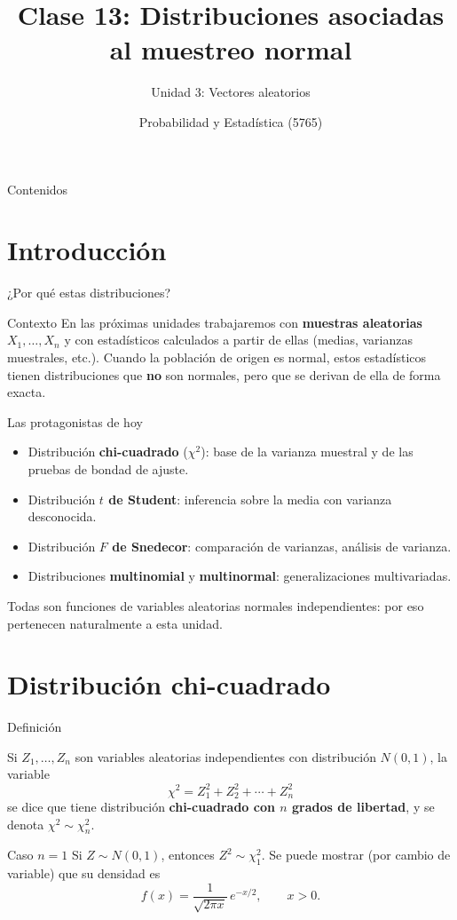 \documentclass[aspectratio=169,11pt]{beamer}
\title[Prob. y Estadística]{Clase 13: Distribuciones asociadas al muestreo normal}
\subtitle{Unidad 3: Vectores aleatorios}
\institute[UNS]{Universidad Nacional del Sur \\ Departamento de Matemática}
\author{Probabilidad y Estadística (5765)}
\date{}
\begin{document}
\begin{frame}
\titlepage
\end{frame}

\begin{frame}{Contenidos}
\tableofcontents
\end{frame}

\section{Introducción}

\begin{frame}{¿Por qué estas distribuciones?}
\begin{block}{Contexto}
En las próximas unidades trabajaremos con \textbf{muestras aleatorias} $X_1,\ldots,X_n$ y con estadísticos calculados a partir de ellas (medias, varianzas muestrales, etc.). Cuando la población de origen es normal, estos estadísticos tienen distribuciones que \textbf{no} son normales, pero que se derivan de ella de forma exacta.
\end{block}
\pause
\begin{block}{Las protagonistas de hoy}
\begin{itemize}
\item Distribución \textbf{chi-cuadrado} ($\chi^2$): base de la varianza muestral y de las pruebas de bondad de ajuste.
\item Distribución \textbf{$t$ de Student}: inferencia sobre la media con varianza desconocida.
\item Distribución \textbf{$F$ de Snedecor}: comparación de varianzas, análisis de varianza.
\item Distribuciones \textbf{multinomial} y \textbf{multinormal}: generalizaciones multivariadas.
\end{itemize}
Todas son funciones de variables aleatorias normales independientes: por eso pertenecen naturalmente a esta unidad.
\end{block}
\end{frame}

\section{Distribución chi-cuadrado}

\begin{frame}{Definición}
\begin{definition}
Si $Z_1,\ldots,Z_n$ son variables aleatorias independientes con distribución $N(0,1)$, la variable
\[
\chi^2 = Z_1^2+Z_2^2+\cdots+Z_n^2
\]
se dice que tiene distribución \textbf{chi-cuadrado con $n$ grados de libertad}, y se denota $\chi^2 \sim \chi^2_n$.
\end{definition}
\pause
\begin{block}{Caso $n=1$}
Si $Z\sim N(0,1)$, entonces $Z^2 \sim \chi_1^2$. Se puede mostrar (por cambio de variable) que su densidad es
\[
f(x) = \frac{1}{\sqrt{2\pi x}}\, e^{-x/2}, \qquad x>0.
\]
\end{block}
\end{frame}
\end{document}
